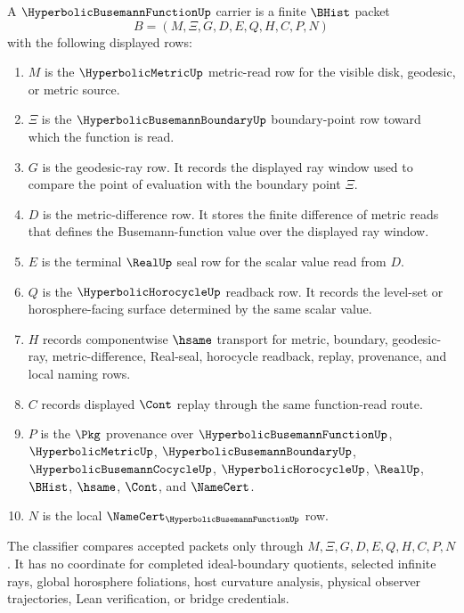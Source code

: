 \begin{definition}
\label{def:hyperbolic-busemann-function-carrier}
A $\HyperbolicBusemannFunctionUp$ carrier is a finite $\BHist$ packet
$$
B=(M,\Xi,G,D,E,Q,H,C,P,N)
$$
with the following displayed rows:
\begin{enumerate}
\item $M$ is the $\HyperbolicMetricUp$ metric-read row for the visible disk, geodesic, or metric source.
\item $\Xi$ is the $\HyperbolicBusemannBoundaryUp$ boundary-point row toward which the function is read.
\item $G$ is the geodesic-ray row. It records the displayed ray window used to compare the point of evaluation with the boundary point $\Xi$.
\item $D$ is the metric-difference row. It stores the finite difference of metric reads that defines the Busemann-function value over the displayed ray window.
\item $E$ is the terminal $\RealUp$ seal row for the scalar value read from $D$.
\item $Q$ is the $\HyperbolicHorocycleUp$ readback row. It records the level-set or horosphere-facing surface determined by the same scalar value.
\item $H$ records componentwise $\hsame$ transport for metric, boundary, geodesic-ray, metric-difference, Real-seal, horocycle readback, replay, provenance, and local naming rows.
\item $C$ records displayed $\Cont$ replay through the same function-read route.
\item $P$ is the $\Pkg$ provenance over $\HyperbolicBusemannFunctionUp$, $\HyperbolicMetricUp$, $\HyperbolicBusemannBoundaryUp$, $\HyperbolicBusemannCocycleUp$, $\HyperbolicHorocycleUp$, $\RealUp$, $\BHist$, $\hsame$, $\Cont$, and $\NameCert$.
\item $N$ is the local $\NameCert_{\HyperbolicBusemannFunctionUp}$ row.
\end{enumerate}
The classifier compares accepted packets only through $M,\Xi,G,D,E,Q,H,C,P,N$. It has no coordinate for completed ideal-boundary quotients, selected infinite rays, global horosphere foliations, host curvature analysis, physical observer trajectories, Lean verification, or bridge credentials.
\end{definition}

